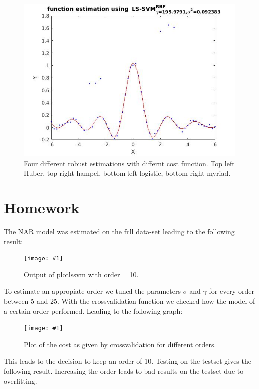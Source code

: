 \documentclass[•]{article}
\newcommand{\apicture}[2] {
  \begin{figure}[H]
  \centering
  \texttt{[image: \#1]}
  \caption{#2}
  \end{figure}
}
\begin{document}
\begin{figure}[H]
\begin{minipage}{.45\textwidth}
\end{minipage}
\begin{minipage}{.45\textwidth}
\includegraphics[width=.8\textwidth]{robustmyriad.jpg}
\end{minipage}
\caption{Four different robust estimations with differnt cost function. Top left Huber, top right hampel, bottom left logistic, bottom right myriad.}
\end{figure}

\section{Homework}
The NAR model was estimated on the full data-set leading to the following result:
\apicture{ARmodel.jpg}{Output of plotlssvm with order = 10.}

To estimate an appropiate order we tuned the parameters $\sigma$ and $\gamma$ for every order between 5 and 25. With the crossvalidation function we checked how the model of a certain order performed. Leading to the following graph:

\apicture{paramplot.jpg}{Plot of the cost as given by crossvalidation for different orders.}

This leads to the decision to keep an order of 10. Testing on the testset gives the following result. Increasing the order leads to bad results on the testset due to overfitting.
\end{document}

